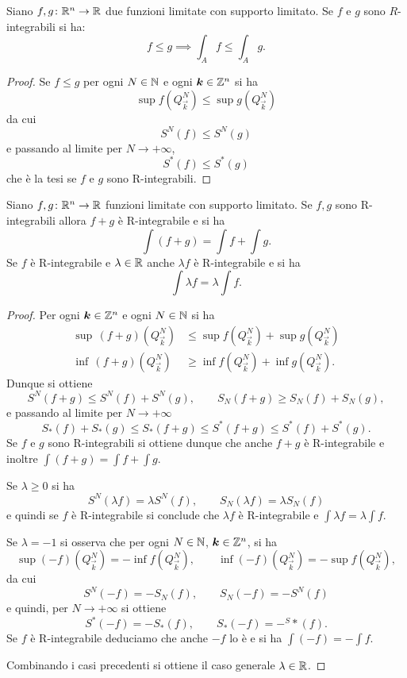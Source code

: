 \begin{theorem}
Siano $f,g\colon {\mathbb R}^n\to{\mathbb R}$ due funzioni limitate con supporto limitato.
Se $f$ e $g$ sono $R$-integrabili si ha:
\[
  f \le g \implies \int_A f \le \int_A g.
\]
\end{theorem}
%
\begin{proof}
Se $f\le g$ per ogni $N\in {\mathbb N}$ e ogni $\boldsymbol k \in {\mathbb Z}^n$ si ha 
\[
    \sup f(Q^N_{\vec k}) \le \sup g(Q^N_{\vec k}) 
\]
da cui 
\[
    S^N(f) \le S^N(g)
\]
e passando al limite per $N\to +\infty$,
\[
  S^*(f) \le S^*(g)
\]
che è la tesi se $f$ e $g$ sono R-integrabili.
\end{proof}

\begin{theorem}
Siano $f,g\colon {\mathbb R}^n \to {\mathbb R}$ funzioni limitate con supporto limitato.
Se $f,g$ sono R-integrabili allora $f+g$ è R-integrabile e si ha 
\[
    \int (f+g) = \int f + \int g.
\]
Se $f$ è R-integrabile e $\lambda\in {\mathbb R}$ anche $\lambda f$ è R-integrabile 
e si ha 
\[
    \int \lambda f = \lambda \int f.
\]
\end{theorem}
\begin{proof}
Per ogni $\boldsymbol k\in{\mathbb Z}^n$ e ogni $N\in {\mathbb N}$
si ha
\begin{align*}
  \sup\, (f+g)(Q^N_{\vec k}) &\le \sup f(Q^N_{\vec k}) + \sup g(Q^N_{\vec k})\\
  \inf\, (f+g)(Q^N_{\vec k}) &\ge \inf f(Q^N_{\vec k}) + \inf g(Q^N_{\vec k}).
\end{align*}
Dunque si ottiene
\[
    S^N(f+g) \le S^N(f) + S^N(g),  \qquad
    S_N(f+g) \ge S_N(f) + S_N(g), 
\]
e passando al limite per $N\to +\infty$ 
\[
   S_*(f) + S_*(g) \le S_*(f+g) \le S^*(f+g) \le S^*(f) + S^*(g).
\]
Se $f$ e $g$ sono R-integrabili si ottiene dunque che anche $f+g$ 
è R-integrabile e inoltre $\int (f+g) = \int f + \int g$.

Se $\lambda \ge 0$ si ha 
\[
   S^N(\lambda f) = \lambda S^N(f), \qquad S_N(\lambda f) = \lambda S_N(f)
\]
e quindi se $f$ è R-integrabile si conclude 
che $\lambda f$ è R-integrabile e $\int \lambda f = \lambda \int f$.

Se $\lambda = -1$ si osserva che per ogni $N\in {\mathbb N}$, $\boldsymbol k\in {\mathbb Z}^n$, 
si ha 
\[
   \sup (-f)(Q^N_{\vec k}) = -\inf f(Q^N_{\vec k}),
   \qquad 
   \inf (-f)(Q^N_{\vec k}) = -\sup f(Q^N_{\vec k}),
\]
da cui 
\[
    S^N(-f) = -S_N(f), \qquad S_N(-f) = -S^N(f)
\]
e quindi, per $N\to +\infty$ si ottiene 
\[
  S^*(-f) = -S_*(f), \qquad S_*(-f) = - ^S*(f).
\]
Se $f$ è R-integrabile deduciamo che anche $-f$ lo è e si ha 
$\int (-f) = -\int f$.

Combinando i casi precedenti si ottiene il caso generale $\lambda \in {\mathbb R}$.
\end{proof}

